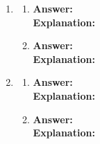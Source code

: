 \documentclass{article}
\begin{document}
\thispagestyle{fancy} %
\begin{enumerate}
	\item 
	\begin{enumerate}
		\item \textbf{Answer:}  \\
        \textbf{Explanation:} \\
        \item \textbf{Answer:} \\
        \textbf{Explanation:} \\
	\end{enumerate}
	\item 
	\begin{enumerate}
		\item \textbf{Answer:}  \\
        \textbf{Explanation:} \\
		\item \textbf{Answer:} \\
        \textbf{Explanation:} \\
	\end{enumerate}
\end{enumerate}
\newpage
\end{document}
